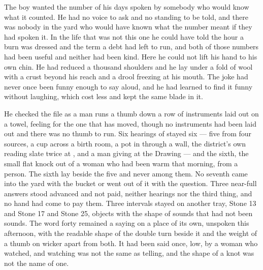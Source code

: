 The boy wanted the number of his days spoken by somebody who would know what it counted. He had no voice to ask and no standing to be told, and there was nobody in the yard who would have known what the number meant if they had spoken it. In the life that was not this one he could have told the hour a burn was dressed and the term a debt had left to run, and both of those numbers had been useful and neither had been kind. Here he could not lift his hand to his own chin. He had reduced a thousand shoulders and he lay under a fold of wool with a crust beyond his reach and a drool freezing at his mouth. The joke had never once been funny enough to say aloud, and he had learned to find it funny without laughing, which cost less and kept the same blade in it.

He checked the file as a man runs a thumb down a row of instruments laid out on a towel, feeling for the one that has moved, though no instruments had been laid out and there was no thumb to run. Six hearings of  stayed six — five from four sources, a cup across a birth room, a pot in  through a wall, the district's own reading slate twice at , and a man giving at the Drawing — and the sixth, the small flat knock out of a woman who had been warm that morning, from a person. The sixth lay beside the five and never among them. No seventh came into the yard with the bucket or went out of it with the question. Three near-full answers stood advanced and not paid, neither hearings nor the third thing, and no hand had come to pay them. Three intervals stayed on another tray, Stone 13 and Stone 17 and Stone 25, objects with the shape of sounds that had not been sounds. The word forty remained a saying on a place of its own, unspoken this afternoon, with the readable shape of the double turn beside it and the weight of a thumb on wicker apart from both. It had been said once, low, by a woman who watched, and watching was not the same as telling, and the shape of a knot was not the name of one.

